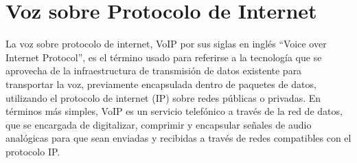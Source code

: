 \documentclass[12pt]{memoir}
\begin{document}
	
	\section{Voz sobre Protocolo de Internet}
	
	La voz sobre protocolo de internet, VoIP por sus siglas en 
	inglés “Voice over Internet Protocol”, es el término usado 
	para referirse a la tecnología que se aprovecha de la 
	infraestructura de transmisión de datos existente para 
	transportar la voz, previamente encapsulada dentro de paquetes 
	de datos, utilizando el protocolo de internet (IP) sobre 
	redes públicas o privadas. En términos más simples, VoIP 
	es un servicio telefónico a través de la red de datos, 
	que se encargada de digitalizar, comprimir y encapsular 
	señales de audio analógicas para que sean enviadas y recibidas 
	a través de redes compatibles con el protocolo IP.
	
	


	
\end{document}
